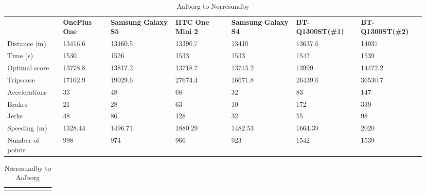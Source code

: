 \begin{landscape}
\begin{table*}[h]
\hspace{-2.5in}
\begin{minipage}{0.95\textwidth}
\caption{Aalborg to Nørresundby}
\label{exp2trip3}
\begin{tabular}{|l|llllll|}
\hline
\rowcolor{tablegreen}

                 & \textbf{OnePlus One} & \textbf{Samsung Galaxy S5} & \textbf{HTC One Mini 2} & \textbf{Samsung Galaxy S4} & \textbf{BT-Q1300ST(\#1)} & \textbf{BT-Q1300ST(\#2)} \\
Distance (m)     & 13416.6     & 13460.5           & 13390.7        & 13410             & 13637.6         & 14037           \\
Time (s)         & 1530        & 1526              & 1533           & 1533              & 1542            & 1539            \\
Optimal score    & 13778.8     & 13817.2           & 13718.7        & 13745.2           & 13999           & 14472.2         \\
Tripscore        & 17102.9     & 19029.6           & 27674.4        & 16671.8           & 26439.6         & 36530.7         \\
Accelerations    & 33          & 48                & 68             & 32                & 83              & 147             \\
Brakes           & 21          & 28                & 63             & 10                & 172             & 339             \\
Jerks            & 48          & 86                & 128            & 32                & 55              & 98              \\
Speeding (m)     & 1328.44     & 1496.71           & 1880.29        & 1482.53           & 1664.39         & 2020            \\
Number of points & 998         & 974               & 966            & 923               & 1542            & 1539            \\\hline
\end{tabular}
\end{minipage}
\end{table*}
\vspace{10 mm}
\begin{table*}[h]
\hspace{-2.5in}
\begin{minipage}{0.95\textwidth}
\caption{Nørresundby to Aalborg}
\label{exp2trip4}
\begin{tabular}{|l|llllll|}
\hline
\rowcolor{tablegreen}


\end{tabular}
\end{minipage}
\end{table*}
\end{landscape}
